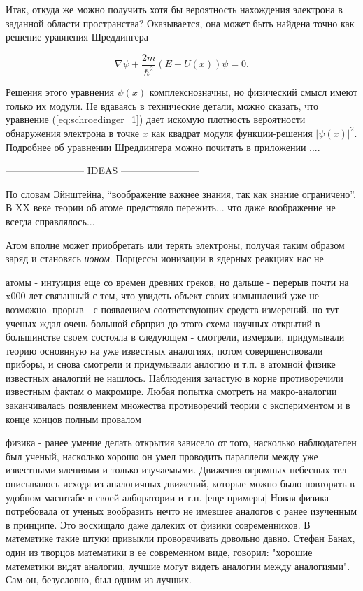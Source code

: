 Итак, откуда же можно получить хотя бы вероятность нахождения электрона в заданной области пространства?
Оказывается, она может быть найдена точно как решение уравнения Шреддингера

\begin{equation}\label{eq:schroedinger_1}
\nabla\psi + \frac{2m}{\hbar^2}(E - U(x))\psi = 0.
\end{equation}

Решения этого уравнения $\psi(x)$ комплекснозначны, но физический смысл имеют только их модули. 
Не вдаваясь в технические детали, можно сказать, что уравнение (\ref{eq:schroedinger_1}) дает искомую плотность вероятности обнаружения электрона в точке $x$ как квадрат модуля функции-решения $|\psi(x)|^2$.
Подробнее об уравнении Шреддингера можно почитать в приложении ....


------------------------ IDEAS ------------------------ 

По словам Эйнштейна, ``воображение важнее знания, так как знание ограничено''.
В XX веке теории об атоме предстояло пережить... что даже воображение не всегда справлялось...


Атом вполне может приобретать или терять электроны, получая таким образом заряд и становясь \textit{ионом}.
Порцессы ионизации в ядерных реакциях нас не 



атомы - интуиция еще со времен древних греков, но дальше - перерыв почти на x000 лет связанный с тем, что увидеть объект своих измышлений уже не возможно.
прорыв - с появлением соответсвующих средств измерений, но тут ученых ждал очень большой сбрприз
до этого схема научных открытий в большинстве своем состояла в следующем - смотрели, измеряли, придумывали теорию основнную на уже известных аналогиях, потом совершенствовали приборы, и снова смотрели и придумывали анлогию и т.п.
в атомной физике известных аналогий не нашлось. Наблюдения зачастую в корне противоречили известным фактам о макромире. Любая попытка смотреть на макро-аналогии заканчивалась появлением множества противоречий теории с экспериментом и в конце концов полным провалом 


физика - ранее умение делать открытия зависело от того, насколько наблюдателен был ученый, насколько хорошо он умел проводить параллели между уже известными ялениями и только изучаемыми.
Движения огромных небесных тел описывалось исходя из аналогичных движений, которые можно было повторять в удобном масштабе в своей алборатории и т.п. [еще примеры]
Новая физика потребовала от ученых вообразить нечто не имевшее аналогов с ранее изученным в принципе. 
Это восхищало даже далеких от физики современников.
В математике такие штуки привыкли проворачивать довольно давно. 
Стефан Банах, один из творцов математики в ее современном виде, говорил: "хорошие математики видят аналогии, лучшие могут видеть аналогии между аналогиями". Сам он, безусловно, был одним из лучших.

